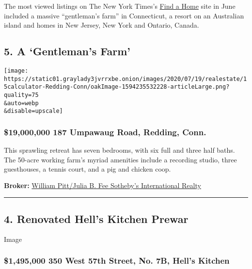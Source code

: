 The most viewed listings on The New York Times's
\href{https://www.nytimes3xbfgragh.onion/real-estate/find-a-home?module=inline}{Find
a Home} site in June included a massive ``gentleman's farm'' in
Connecticut, a resort on an Australian island and homes in New Jersey,
New York and Ontario, Canada.

\hypertarget{5-a-gentlemans-farm}{%
\subsection{5. A `Gentleman's Farm'}\label{5-a-gentlemans-farm}}

\texttt{[image: https://static01.graylady3jvrrxbe.onion/images/2020/07/19/realestate/15calculator-Redding-Conn/oakImage-1594235532228-articleLarge.png?quality=75\\\&auto=webp\\\&disable=upscale]}

\hypertarget{19000000--187-umpawaug-road-redding-conn}{%
\subsubsection{\$19,000,000 \textbar{} 187 Umpawaug Road, Redding,
Conn.}\label{19000000--187-umpawaug-road-redding-conn}}

This sprawling retreat has seven bedrooms, with six full and three half
baths. The 50-acre working farm's myriad amenities include a recording
studio, three guesthouses, a tennis court, and a pig and chicken coop.

\textbf{Broker:}
\href{https://www.nytimes3xbfgragh.onion/real-estate/usa/ct/redding/homes-for-sale/maple-hill-farm-on-nearly-50-acres/2918-170292028?channel=sale}{William
Pitt/Julia B. Fee Sotheby's International Realty}

\begin{center}\rule{0.5\linewidth}{\linethickness}\end{center}

\hypertarget{4-renovated-hells-kitchen-prewar}{%
\subsection{4. Renovated Hell's Kitchen
Prewar}\label{4-renovated-hells-kitchen-prewar}}

Image

\hypertarget{1495000--350-west-57th-street-no-7b-hells-kitchen}{%
\subsubsection{\$1,495,000 \textbar{} 350 West 57th Street, No. 7B,
Hell's
Kitchen}\label{1495000--350-west-57th-street-no-7b-hells-kitchen}}

